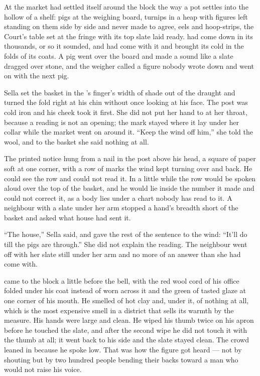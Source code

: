 At  the market had settled itself around the block the way a pot settles into the hollow of a shelf: pigs at the weighing board, turnips in a heap with figures left standing on them side by side and never made to agree, eels and hoop-strips, the Court's table set at the  fringe with its top slate laid ready.  had come down in its thousands, or so it sounded, and  had come with it and brought its cold in the folds of its coats. A pig went over the board and made a sound like a slate dragged over stone, and the weigher called a figure nobody wrote down and went on with the next pig.

Sella set the basket in the 's finger's width of shade out of the draught and turned the fold right at his chin without once looking at his face. The post was cold iron and his cheek took it first. She did not put her hand to  at her throat, because a reading is not an opening; the mark stayed where it lay under her collar while the market went on around it. “Keep the wind off him,” she told the wool, and to the basket she said nothing at all.

The printed notice hung from a nail in the post above his head, a square of paper soft at one corner, with a row of marks the wind kept turning over and back. He could see the row and could not read it. In a little while the row would be spoken aloud over the top of the basket, and he would lie inside the number it made and could not correct it, as a body lies under a chart nobody has read to it. A neighbour with a slate under her arm stopped a hand's breadth short of the basket and asked what house had sent it.

“The house,” Sella said, and gave the rest of the sentence to the wind: “It'll do till the pigs are through.” She did not explain the reading. The neighbour went off with her slate still under her arm and no more of an answer than she had come with.

\scenebreak

 came to the block a little before the bell, with the red wool cord of his office folded under his coat instead of worn across it and the green of tasted glaze at one corner of his mouth. He smelled of hot clay and, under it, of nothing at all, which is the most expensive smell in a district that sells its warmth by the measure. His hands were large and clean. He wiped his thumb twice on his apron before he touched the slate, and after the second wipe he did not touch it with the thumb at all; it went back to his side and the slate stayed clean. The crowd leaned in because he spoke low. That was how the figure got heard --- not by shouting but by two hundred people bending their backs toward a man who would not raise his voice.

